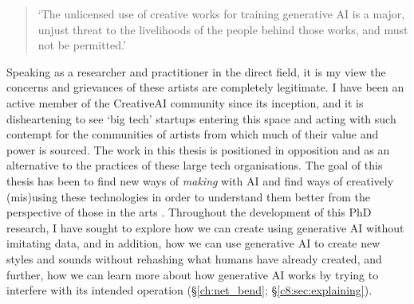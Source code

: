 \begin{quote}
`The unlicensed use of creative works for training generative AI is a major, unjust threat to the livelihoods of the people behind those works, and must not be permitted.' \citep{aistatement2024}
\end{quote}


Speaking as a researcher and practitioner in the direct field, it is my view the concerns and grievances of these artists are completely legitimate. 
I have been an active member of the CreativeAI community since its inception, and it is disheartening to see `big tech' startups entering this space and acting with such contempt for the communities of artists from which much of their value and power is sourced. 
The work in this thesis is positioned in opposition and as an alternative to the practices of these large tech organisations. 
The goal of this thesis has been to find new ways of \textit{making} with AI and find ways of creatively (mis)using these technologies in order to understand them better from the perspective of those in the arts \citep{salvaggio2023aarg}.
Throughout the development of this PhD research, I have sought to explore how we can create using generative AI without imitating data, and in addition, how we can use generative AI to create new styles and sounds without rehashing what humans have already created, and further, how we can learn more about how generative AI works by trying to interfere with its intended operation (\S \ref{ch:net_bend}; \S \ref{c8:sec:explaining}).

